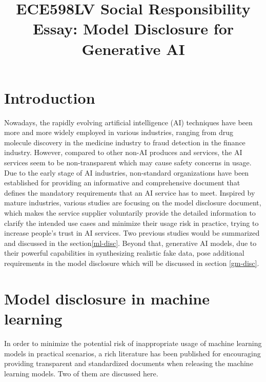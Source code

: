 \documentclass[conference]{IEEEtran}
\begin{document}
\def\BibTeX{{\rm B\kern-.05em{\sc i\kern-.025em b}\kern-.08em
    T\kern-.1667em\lower.7ex\hbox{E}\kern-.125emX}}


\title{ECE598LV Social Responsibility Essay: Model Disclosure for Generative AI}

\author{
}

\maketitle 


\section*{Introduction}
Nowadays, the rapidly evolving artificial intelligence (AI) techniques have been more and more widely employed in various industries, ranging from drug molecule discovery in the medicine industry to fraud detection in the finance industry. 
However, compared to other non-AI produces and services, the AI services seem to be non-transparent which may cause safety concerns in usage. 
Due to the early stage of AI industries, non-standard organizations have been established for providing an informative and comprehensive document that defines the mandatory requirements that an AI service has to meet. 
Inspired by mature industries, various studies are focusing on the model disclosure document, which makes the service supplier voluntarily provide the detailed information to clarify the intended use cases and minimize their usage risk in practice, trying to increase people's trust in AI services. 
Two previous studies would be summarized and discussed in the section\ref{ml-disc}. 
Beyond that, generative AI models, due to their powerful capabilities in synthesizing realistic fake data, pose additional requirements in the model disclosure which will be discussed in section \ref{gm-disc}. 


\section*{Model disclosure in machine learning}
\label{ml-disc}
In order to minimize the potential risk of inappropriate usage of machine learning models in practical scenarios, 
a rich literature has been published for encouraging providing transparent and standardized documents when releasing the machine learning models. 
Two of them are discussed here. 
\end{document}
